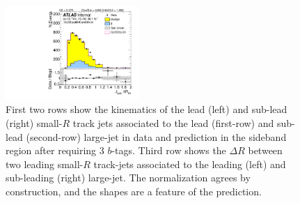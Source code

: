 \begin{figure}[htbp!]
\begin{center}
\includegraphics[width=0.45\textwidth,angle=-90]{figures/boosted/Sideband/b77_ThreeTag_Sideband_sublHCand_trk_dr.pdf}
  \caption{First two rows show the kinematics of the lead (left) and sub-lead (right) small-$R$ track jets associated to the lead (first-row) and sub-lead (second-row) large-\R jet in data and prediction in the sideband region after requiring 3 $b$-tags. Third row shows the $\Delta R$ between two leading small-$R$ track-jets associated to the leading (left) and sub-leading (right) large-\R jet. The normalization agrees by construction, and the shapes are a feature of the prediction. }
  \label{fig:boosted-3b-sideband-ak2}
\end{center}
\end{figure}


